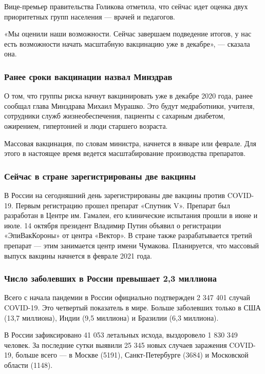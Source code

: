 Вице-премьер правительства Голикова отметила, что сейчас идет оценка двух
приоритетных групп населения --- врачей и педагогов.

«Мы оценили наши возможности. Сейчас завершаем подведение итогов, у нас есть
возможности начать масштабную вакцинацию уже в декабре», --- сказала она.

\subsubsection{Ранее сроки вакцинации назвал Минздрав}

О том, что группы риска начнут вакцинировать уже в декабре 2020 года, ранее
сообщал глава Минздрава Михаил Мурашко. Это будут медработники, учителя,
сотрудники служб жизнеобеспечения, пациенты с сахарным диабетом, ожирением,
гипертонией и люди старшего возраста.

Массовая вакцинация, по словам министра, начнется в январе или феврале. Для
этого в настоящее время ведется масштабирование производства препаратов.

\subsubsection{Сейчас в стране зарегистрированы две вакцины}

В России на сегодняшний день зарегистрированы две вакцины против COVID-19.
Первым регистрацию прошел препарат «Спутник V». Препарат был разработан в
Центре им. Гамалеи, его клинические испытания прошли в июне и июле. 14 октября
президент Владимир Путин объявил о регистрации «ЭпиВакКороны» от центра
«Вектор». В стране также разрабатывается третий препарат --- этим занимается
центр имени Чумакова. Планируется, что массовый выпуск вакцины начнется в
феврале 2021 года.

\subsubsection{Число заболевших в России превышает 2,3 миллиона}

Всего с начала пандемии в России официально подтвержден 2 347 401 случай
COVID-19. Это четвертый показатель в мире. Больше заболевших только в США (13,7
миллиона), Индии (9,5 миллиона) и Бразилии (6,3 миллиона).

В России зафиксировано 41 053 летальных исхода, выздоровело 1 830 349 человек.
За последние сутки выявили 25 345 новых случаев заражения COVID-19, больше
всего --- в Москве (5191), Санкт-Петербурге (3684) и Московской области (1148).
